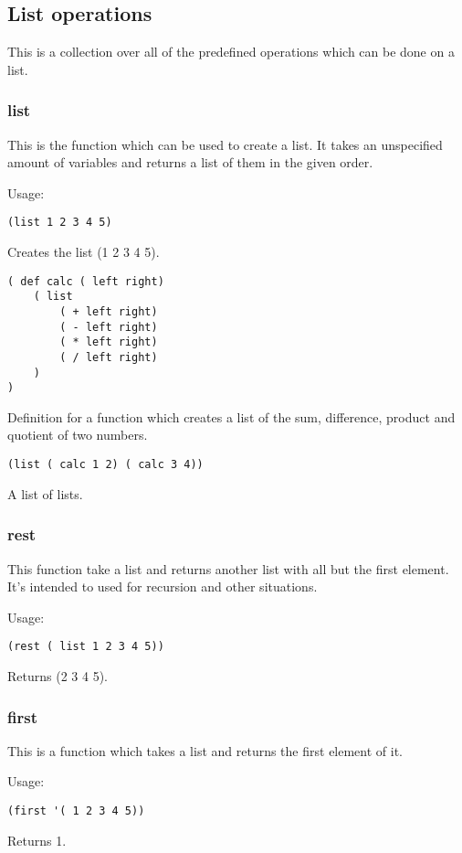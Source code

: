 \subsection{List operations}

This is a collection over all of the predefined operations which can be done on a list.

\subsubsection{list}

This is the function which can be used to create a list. 
It takes an unspecified amount of variables and returns a list of them in the given order. 

Usage:
\begin{lstlisting}
(list 1 2 3 4 5)
\end{lstlisting}
Creates the list (1 2 3 4 5).
\begin{lstlisting}
( def calc ( left right) 
	( list
		( + left right)
		( - left right)
		( * left right)
		( / left right)
	)
)
\end{lstlisting}
Definition for a function which creates a list of the sum, difference, product and quotient of two numbers.
\begin{lstlisting}
(list ( calc 1 2) ( calc 3 4))
\end{lstlisting}
A list of lists.

\subsubsection{rest}

This function take a list and returns another list with all but the first element. 
It's intended to used for recursion and other situations. 

Usage:
\begin{lstlisting}
(rest ( list 1 2 3 4 5))
\end{lstlisting}
Returns (2 3 4 5).

\subsubsection{first}

This is a function which takes a list and returns the first element of it.

Usage:
\begin{lstlisting}
(first '( 1 2 3 4 5))
\end{lstlisting}
Returns 1.

